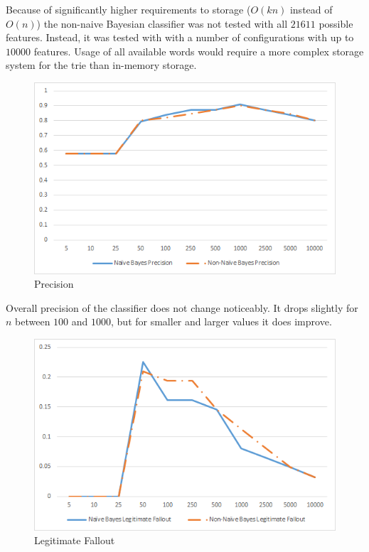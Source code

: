 \documentclass[12pt]{report}
\begin{document}
Because of significantly higher requirements to storage ($O(kn)$ instead of $O(n)$) the non-naive Bayesian classifier was not tested with all $21611$ possible features. Instead, it was tested with with a number of configurations with up to $10000$ features. Usage of all available words would require a more complex storage system for the trie than in-memory storage.

\begin{figure}[ht!]
	\centering
	\includegraphics[width=120mm]{Precision.png}
	\caption{Precision}
	\label{PrecisionGraph}
\end{figure}

Overall precision of the classifier does not change noticeably. It drops slightly for $n$ between $100$ and $1000$, but for smaller and larger values it does improve.

\begin{figure}[ht!]
	\centering
	\includegraphics[width=120mm]{LegitimateFallout.png}
	\caption{Legitimate Fallout}
	\label{LegitimateFalloutGraph}
\end{figure}
\end{document}

